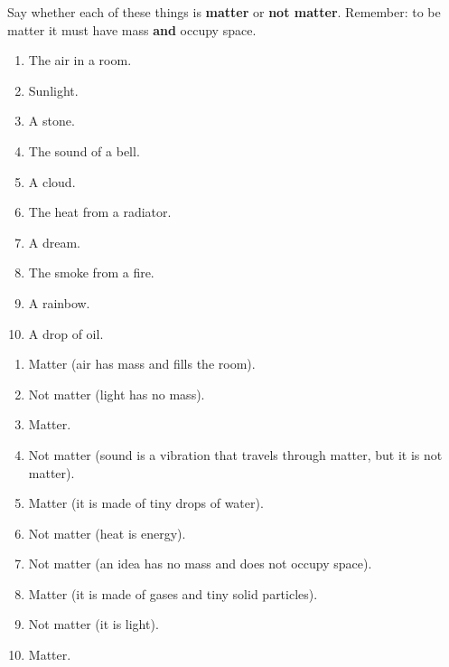 \begin{exercise}
    Say whether each of these things is \textbf{matter} or \textbf{not matter}. Remember: to be matter it must have mass \textbf{and} occupy space.
    \begin{enumerate}[label=\letraminuscula]
        \item The air in a room.
        \item Sunlight.
        \item A stone.
        \item The sound of a bell.
        \item A cloud.
        \item The heat from a radiator.
        \item A dream.
        \item The smoke from a fire.
        \item A rainbow.
        \item A drop of oil.
    \end{enumerate}
    \begin{solu}
        \begin{enumerate}[label=\alph*)]
            \item Matter (air has mass and fills the room).
            \item Not matter (light has no mass).
            \item Matter.
            \item Not matter (sound is a vibration that travels through matter, but it is not matter).
            \item Matter (it is made of tiny drops of water).
            \item Not matter (heat is energy).
            \item Not matter (an idea has no mass and does not occupy space).
            \item Matter (it is made of gases and tiny solid particles).
            \item Not matter (it is light).
            \item Matter.
        \end{enumerate}
    \end{solu}
\end{exercise}

